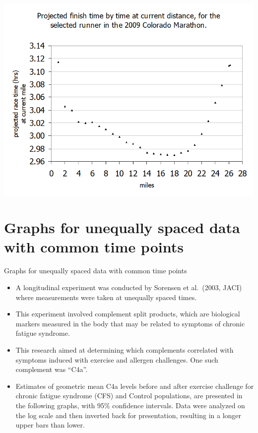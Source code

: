 \documentclass[
  9pt,
  ignorenonframetext,
]{beamer}
\providecommand{\tightlist}{%
  \setlength{\itemsep}{0pt}\setlength{\parskip}{0pt}}
\begin{document}
\begin{frame}{}
\protect\hypertarget{section-6}{}
\tiny

\begin{center}\includegraphics[width=0.6\linewidth]{figs_L2/L2-f12} \end{center}

\tiny
\end{frame}

\hypertarget{graphs-for-unequally-spaced-data-with-common-time-points}{%
\section{Graphs for unequally spaced data with common time
points}\label{graphs-for-unequally-spaced-data-with-common-time-points}}

\begin{frame}{Graphs for unequally spaced data with common time points}
\begin{itemize}
\tightlist
\item
  A longitudinal experiment was conducted by Sorensen et al.~(2003,
  JACI) where measurements were taken at unequally spaced times.
\item
  This experiment involved complement split products, which are
  biological markers measured in the body that may be related to
  symptoms of chronic fatigue syndrome.
\item
  This research aimed at determining which complements correlated with
  symptoms induced with exercise and allergen challenges. One such
  complement was ``C4a''.
\item
  Estimates of geometric mean C4a levels before and after exercise
  challenge for chronic fatigue syndrome (CFS) and Control populations,
  are presented in the following graphs, with 95\% confidence intervals.
  Data were analyzed on the log scale and then inverted back for
  presentation, resulting in a longer upper bars than lower.
\end{itemize}
\end{frame}
\end{document}
